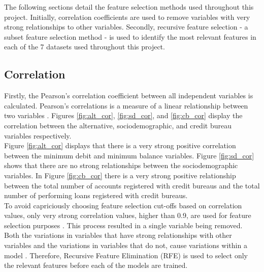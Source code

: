 The following sections detail the feature selection methods used throughout this project. Initially, correlation coefficients are used to remove variables with very strong relationships to other variables. Secondly, recursive feature selection - a subset feature selection method - is used to identify the most relevant features in each of the 7 datasets used throughout this project. 

\subsection{Correlation}

Firstly, the Pearson's correlation coefficient between all independent variables is calculated. Pearson's correlations is a measure of a linear relationship between two variables \parencite{correlation1}. Figures \ref{fig:alt_cor}, \ref{fig:sd_cor}, and \ref{fig:cb_cor} display the correlation between the alternative, sociodemographic, and credit bureau variables respectively. \\

Figure \ref{fig:alt_cor} displays that there is a very strong positive correlation between the minimum debit and minimum balance variables. Figure \ref{fig:sd_cor} shows that there are no strong relationships between the sociodemographic variables. In Figure \ref{fig:cb_cor}  there is a very strong positive relationship between the total number of accounts registered with credit bureaus and the total number of performing loans registered with credit bureaus. \\

To avoid capriciously choosing feature selection cut-offs based on correlation values, only very strong correlation values, higher than 0.9, are used for feature selection purposes \parencite{correlation1}. This process resulted in a single variable being removed.  \\

Both the variations in variables that have strong relationships with other variables and the variations in variables that do not, cause variations within a model \parencite{correlation2}. Therefore, Recursive Feature Elimination (RFE) is used to select only the relevant features before each of the models are trained. \newpage


\vspace{10 pt}

